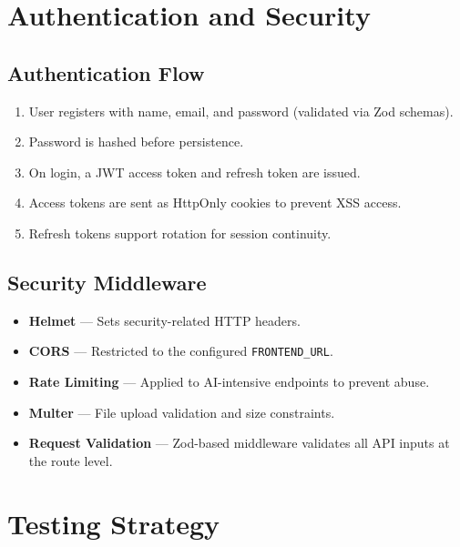 \documentclass[12pt,a4paper]{article}
\begin{document}
\section{Authentication and Security}

\subsection{Authentication Flow}
\begin{enumerate}[leftmargin=1.5cm]
    \item User registers with name, email, and password (validated via Zod schemas).
    \item Password is hashed before persistence.
    \item On login, a JWT access token and refresh token are issued.
    \item Access tokens are sent as HttpOnly cookies to prevent XSS access.
    \item Refresh tokens support rotation for session continuity.
\end{enumerate}

\subsection{Security Middleware}
\begin{itemize}[leftmargin=1.5cm]
    \item \textbf{Helmet} --- Sets security-related HTTP headers.
    \item \textbf{CORS} --- Restricted to the configured \texttt{FRONTEND\_URL}.
    \item \textbf{Rate Limiting} --- Applied to AI-intensive endpoints to prevent abuse.
    \item \textbf{Multer} --- File upload validation and size constraints.
    \item \textbf{Request Validation} --- Zod-based middleware validates all API inputs at the route level.
\end{itemize}

\section{Testing Strategy}
\end{document}
